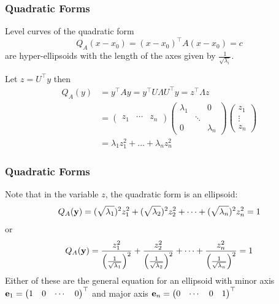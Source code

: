 \documentclass{beamer}
\begin{document}
\begin{frame}\frametitle{Quadratic Forms}
	\begin{lemma}
		Level curves of the quadratic form 
		\[
			Q_A(x-x_0) = (x-x_0)^\top A(x-x_0) = c
		\]
		are hyper-ellipsoids with the length of the axes given by $\frac{1}{\sqrt{\lambda_i}}$.	
	\end{lemma}
	\begin{proofstart}
		Let $z = U^\top y$ then
		\begin{align*}
		 Q_A(y) &= y^\top Ay= y^\top U\Lambda U^\top y = z^\top \Lambda z \\
		 		&= \begin{pmatrix}
		     			z_1 & \cdots & z_n
			   	   \end{pmatrix}
			   	   \begin{pmatrix}
		     			\lambda_1 & & 0\\
		     			& \ddots\\
		     			0 & & \lambda_n
		   			\end{pmatrix}
		   			\begin{pmatrix}
		    			z_1 \\ \vdots \\ z_n
		  			\end{pmatrix} \\
		  		&= \lambda_1 z_1^2 + \dots + \lambda_n z_n^2
		\end{align*}
	\end{proofstart}
\end{frame}

\begin{frame}\frametitle{Quadratic Forms}
	\begin{proofcont}
		Note that in the variable $z$, the quadratic form is an ellipsoid:
		\[ 
			Q_A(\mathbf{y})= (\sqrt{\lambda_1})^2z_1^2 + (\sqrt{\lambda_2})^2z_2^2 + \cdots + (\sqrt{\lambda_n})^2z_n^2 = 1 
		\]
		or
		\[ 
			Q_A(\mathbf{y})= \frac{z_1^2}{\left(\frac{1}{\sqrt{\lambda_1}}\right)^2} + \frac{z_2^2}{\left(\frac{1}{\sqrt{\lambda_2}}\right)^2} + \cdots + \frac{z_n^2}{\left(\frac{1}{\sqrt{\lambda_n}}\right)^2} = 1
		\]
		Either of these are the general equation for an ellipsoid with minor axis 
		$\mathbf{e}_1 = 	\begin{pmatrix}
						1 & 0 & \cdots & 0 
				  	\end{pmatrix}^\top$ 
		and major axis 
		$\mathbf{e}_n = 	\begin{pmatrix} 
						0 & \cdots & 0 & 1
					\end{pmatrix}^\top$
	\end{proofcont}
\end{frame}
\end{document}
